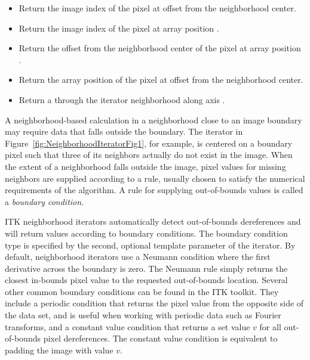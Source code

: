 {\begin{itemize}
\item \textbf{} Return the
image index of the pixel at offset  from the neighborhood 
center.

\item \textbf{} Return the
image index of the pixel at array position .

\item \textbf{}  Return the offset
from the neighborhood center of the pixel at array position .

\item \textbf{}
Return the array position of the pixel at offset  from the
neighborhood center.

\item \textbf{} Return a
 through the iterator neighborhood along axis .

\end{itemize}

A neighborhood-based calculation in a neighborhood close to an image
boundary may require data that falls outside the boundary.  The
iterator in Figure~\ref{fig:NeighborhoodIteratorFig1}, for example, is
centered on a boundary pixel such that three of its neighbors actually
do not exist in the image.  When the extent of a neighborhood falls
outside the image, pixel values for missing neighbors are supplied
according to a rule, usually chosen to satisfy the numerical
requirements of the algorithm.  A rule for supplying out-of-bounds
values is called a \emph{boundary condition}.
 
ITK neighborhood iterators automatically detect out-of-bounds dereferences and
will return values according to boundary conditions.  The boundary condition
type is specified by the second, optional template parameter of the iterator.
By default, neighborhood iterators use a Neumann condition where the first
derivative across the boundary is zero.  The Neumann rule simply returns the
closest in-bounds pixel value to the requested out-of-bounds location.  Several
other common boundary conditions can be found in the ITK toolkit.  They include
a periodic condition that returns the pixel value from the opposite side of the
data set, and is useful when working with periodic data such as Fourier
transforms, and a constant value condition that returns a set value $v$ for all
out-of-bounds pixel dereferences.  The constant value condition is equivalent
to padding the image with value $v$.

}
